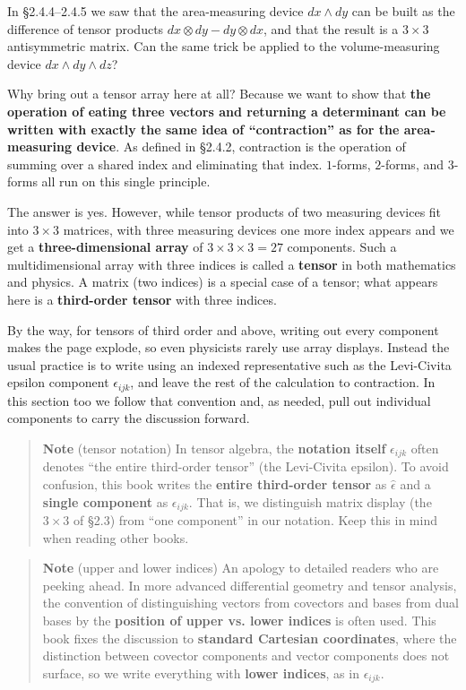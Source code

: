 \documentclass[a4paper,12pt,openany]{book}
\begin{document}
In §2.4.4–2.4.5 we saw that the area-measuring device \(dx \wedge dy\)
can be built as the difference of tensor products
\(dx \otimes dy - dy \otimes dx\), and that the result is a
\(3 \times 3\) antisymmetric matrix. Can the same trick be applied to
the volume-measuring device \(dx \wedge dy \wedge dz\)?

Why bring out a tensor array here at all? Because we want to show that
\textbf{the operation of eating three vectors and returning a determinant can be written with exactly the same idea of “contraction” as for the area-measuring device}.
As defined in §2.4.2, contraction is the operation of summing over a
shared index and eliminating that index. \(1\)-forms, \(2\)-forms, and
\(3\)-forms all run on this single principle.

The answer is yes. However, while tensor products of two measuring
devices fit into \(3 \times 3\) matrices, with three measuring devices
one more index appears and we get a \textbf{three-dimensional array} of
\(3 \times 3 \times 3 = 27\) components. Such a multidimensional array
with three indices is called a \textbf{tensor} in both mathematics and
physics. A matrix (two indices) is a special case of a tensor; what
appears here is a \textbf{third-order tensor} with three indices.

By the way, for tensors of third order and above, writing out every
component makes the page explode, so even physicists rarely use array
displays. Instead the usual practice is to write using an indexed
representative such as the Levi-Civita epsilon component
\(\epsilon_{ijk}\), and leave the rest of the calculation to
contraction. In this section too we follow that convention and, as
needed, pull out individual components to carry the discussion forward.

\begin{quote}
\textbf{Note} (tensor notation) In tensor algebra, the
\textbf{notation itself} \(\epsilon_{ijk}\) often denotes ``the entire
third-order tensor'' (the Levi-Civita epsilon). To avoid confusion, this
book writes the \textbf{entire third-order tensor} as
\(\widehat{\epsilon}\) and a \textbf{single component} as
\(\epsilon_{ijk}\). That is, we distinguish matrix display (the
\(3\times3\) of §2.3) from ``one component'' in our notation. Keep this
in mind when reading other books.
\end{quote}

\begin{quote}
\textbf{Note} (upper and lower indices) An apology to detailed readers
who are peeking ahead. In more advanced differential geometry and tensor
analysis, the convention of distinguishing vectors from covectors and
bases from dual bases by the
\textbf{position of upper vs. lower indices} is often used. This book
fixes the discussion to \textbf{standard Cartesian coordinates}, where
the distinction between covector components and vector components does
not surface, so we write everything with \textbf{lower indices}, as in
\(\epsilon_{ijk}\).
\end{quote}
\end{document}
